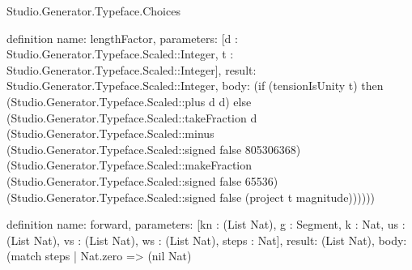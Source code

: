 \begin{lexlean}{Studio.Generator.Typeface.Choices}
\begin{semanticmodule}
definition{
  name: lengthFactor,
  parameters: [d : Studio.Generator.Typeface.Scaled::Integer, t : Studio.Generator.Typeface.Scaled::Integer],
  result: Studio.Generator.Typeface.Scaled::Integer,
  body: (if (tensionIsUnity t) then (Studio.Generator.Typeface.Scaled::plus d d) else (Studio.Generator.Typeface.Scaled::takeFraction d (Studio.Generator.Typeface.Scaled::minus (Studio.Generator.Typeface.Scaled::signed false 805306368) (Studio.Generator.Typeface.Scaled::makeFraction (Studio.Generator.Typeface.Scaled::signed false 65536) (Studio.Generator.Typeface.Scaled::signed false (project t magnitude))))))
}

definition{
  name: forward,
  parameters: [kn : (List Nat), g : Segment, k : Nat, us : (List Nat), vs : (List Nat), ws : (List Nat), steps : Nat],
  result: (List Nat),
  body: (match steps
    | Nat.zero => (nil Nat)
}
\end{semanticmodule}
\end{lexlean}

